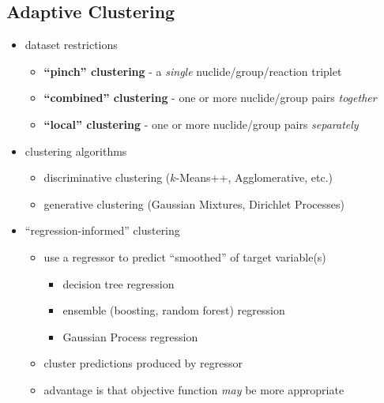 \subsection{Adaptive Clustering}
\label{subsec:chap10-adaptive-cluster}

\begin{itemize}[noitemsep]
  \item dataset restrictions
  \begin{itemize}[noitemsep]
    \item \textbf{``pinch'' clustering} - a \textit{single} nuclide/group/reaction triplet
    \item \textbf{``combined'' clustering} - one or more nuclide/group pairs \textit{together}
    \item \textbf{``local'' clustering} - one or more nuclide/group pairs \textit{separately}
  \end{itemize}
  \item clustering algorithms
  \begin{itemize}[noitemsep]
    \item discriminative clustering ($k$-Means++, Agglomerative, etc.)
    \item generative clustering (Gaussian Mixtures, Dirichlet Processes)
  \end{itemize}
  \item ``regression-informed'' clustering
  \begin{itemize}[noitemsep]
    \item use a regressor to predict ``smoothed'' of target variable(s)
    \begin{itemize}[noitemsep]
      \item decision tree regression
      \item ensemble (boosting, random forest) regression
      \item Gaussian Process regression
    \end{itemize}
    \item cluster predictions produced by regressor
    \item advantage is that objective function \textit{may} be more appropriate
  \end{itemize}
\end{itemize}